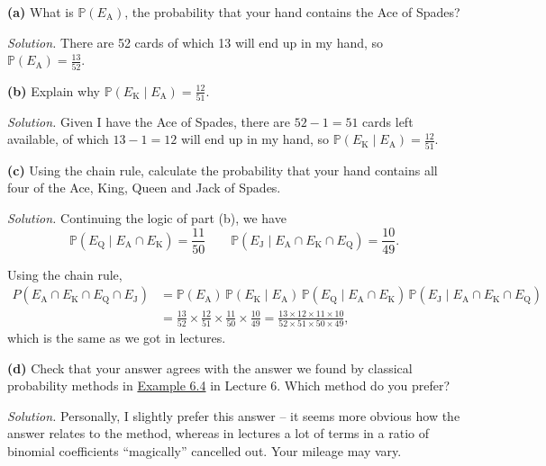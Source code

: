 \documentclass[
  a4paper,
]{book}
\theoremstyle{definition}
\theoremstyle{definition}
\theoremstyle{definition}
\theoremstyle{definition}
\theoremstyle{remark}
\begin{document}
\textbf{(a)} What is \(\mathbb P(E_\mathrm{A})\), the probability that your hand contains the Ace of Spades?

\begin{myanswers}
\emph{Solution.} There are 52 cards of which 13 will end up in my hand, so \(\mathbb P(E_\mathrm{A}) = \frac{13}{52}\).

\end{myanswers}

\textbf{(b)} Explain why \(\mathbb P(E_\mathrm{K} \mid E_\mathrm{A}) = \frac{12}{51}\).

\begin{myanswers}
\emph{Solution.} Given I have the Ace of Spades, there are \(52 - 1 = 51\) cards left available, of which \(13 - 1 = 12\) will end up in my hand, so \(\mathbb P(E_\mathrm{K} \mid E_\mathrm{A}) = \frac{12}{51}\).

\end{myanswers}

\textbf{(c)} Using the chain rule, calculate the probability that your hand contains all four of the Ace, King, Queen and Jack of Spades.

\begin{myanswers}
\emph{Solution.} Continuing the logic of part (b), we have
\[ \mathbb P(E_\mathrm{Q} \mid E_\mathrm{A} \cap E_\mathrm{K}) = \frac{11}{50} \qquad \mathbb P(E_\mathrm{J} \mid E_\mathrm{A} \cap E_\mathrm{K} \cap E_\mathrm{Q}) = \frac{10}{49} . \]

Using the chain rule,
\begin{align*}
P( E_\mathrm{A} \cap E_\mathrm{K} \cap E_\mathrm{Q} \cap E_\mathrm{J} )
  &= \mathbb P(E_\mathrm{A}) \, \mathbb P(E_\mathrm{K} \mid E_\mathrm{A}) \, \mathbb P(E_\mathrm{Q} \mid E_\mathrm{A} \cap E_\mathrm{K}) \, \mathbb P(E_\mathrm{J} \mid E_\mathrm{A} \cap E_\mathrm{K} \cap E_\mathrm{Q}) \\
  &= \frac{13}{52} \times \frac{12}{51} \times \frac{11}{50} \times \frac{10}{49} = \frac{13 \times 12 \times 11 \times 10}{52 \times 51 \times 50 \times 49} , 
\end{align*}
which is the same as we got in lectures.

\end{myanswers}

\textbf{(d)} Check that your answer agrees with the answer we found by classical probability methods in \href{L06-classical-ii.html\#exm:akqj}{Example 6.4} in Lecture 6. Which method do you prefer?

\begin{myanswers}
\emph{Solution.} Personally, I slightly prefer this answer -- it seems more obvious how the answer relates to the method, whereas in lectures a lot of terms in a ratio of binomial coefficients ``magically'' cancelled out. Your mileage may vary.

\end{myanswers}
\end{document}
